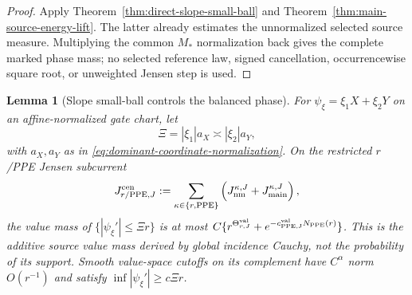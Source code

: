 \documentclass[11pt]{article}
\newtheorem{lemma}[theorem]{Lemma}
\begin{document}
\begin{proof}
Apply Theorem~\ref{thm:direct-slope-small-ball} and
Theorem~\ref{thm:main-source-energy-lift}.  The latter already estimates the
unnormalized selected source measure.  Multiplying the common $M_*$
normalization back gives the complete marked phase mass; no selected
reference law, signed cancellation, occurrencewise square root, or
unweighted Jensen step is used.
\end{proof}

\begin{lemma}[Slope small-ball controls the balanced phase]
\label{lem:slope-good-bad-phase}
For $\psi_\xi=\xi_1X+\xi_2Y$ on an affine-normalized gate chart, let
\begin{equation}
\label{eq:balanced-physical-frequency}
 \Xi=|\xi_1|a_X\asymp|\xi_2|a_Y,
\end{equation}
with $a_X,a_Y$ as in \eqref{eq:dominant-coordinate-normalization}.  On the
restricted $r$/PPE Jensen subcurrent
\[
 J_{r/{\rm PPE},J}^{\rm cen}:=
 \sum_{\kappa\in\{r,{\rm PPE}\}}
 \left(J_{\rm nm}^{\kappa,J}+J_{\rm main}^{\kappa,J}\right),
\]
the value mass of
$\{|\psi_\xi'|\le\Xi r\}$ is at most
$C\{r^{\Theta_{r,J}^{\rm val}}
+e^{-c_{\rm PPE,J}^{\rm val}N_{\rm PPE}(r)}\}$.  This is the additive
source value mass derived by global incidence Cauchy, not the probability of
its support.  Smooth value-space cutoffs on its complement have
$C^\alpha$ norm $O(r^{-1})$ and satisfy
$\inf|\psi_\xi'|\ge c\Xi r$.
\end{lemma}
\end{document}
